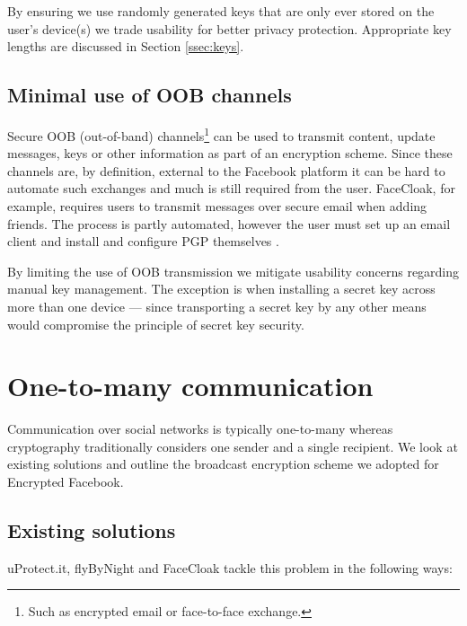 By ensuring we use randomly generated keys that are only ever stored on the user's device(s) we trade usability for better privacy protection. Appropriate key lengths are discussed in Section \ref{ssec:keys}.


\FloatBarrier
\subsection{Minimal use of OOB channels}

Secure OOB (out-of-band) channels\footnote{Such as encrypted email or face-to-face exchange.} can be used to transmit content, update messages, keys or other information as part of an encryption scheme. Since these channels are, by definition, external to the Facebook platform it can be hard to automate such exchanges and much is still required from the user. FaceCloak, for example, requires users to transmit messages over secure email when adding friends. The process is partly automated, however the user must set up an email client and install and configure PGP themselves \cite{facecloak}.

By limiting the use of OOB transmission we mitigate usability concerns regarding manual key management. The exception is when installing a secret key across more than one device --- since transporting a secret key by any other means would compromise the principle of secret key security.


\FloatBarrier
\section{One-to-many communication}

Communication over social networks is typically one-to-many whereas cryptography traditionally considers one sender and a single recipient. We look at existing solutions and outline the broadcast encryption scheme we adopted for Encrypted Facebook.


\FloatBarrier
\subsection{Existing solutions}
\label{ssec:exist}

uProtect.it, flyByNight and FaceCloak tackle this problem in the following ways:

